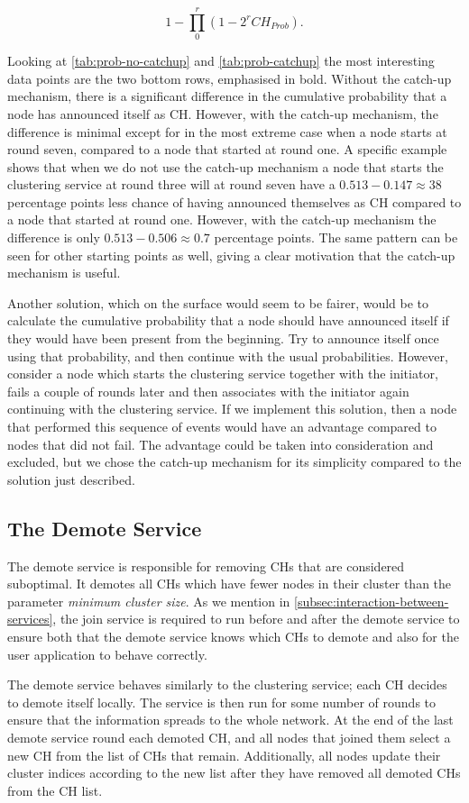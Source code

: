 \begin{equation}
1 - \prod_0^r (1 - 2^rCH_{Prob}).   
\end{equation}

Looking at \cref{tab:prob-no-catchup} and \cref{tab:prob-catchup} the most interesting data points are the two bottom rows, emphasised in bold. Without the catch-up mechanism, there is a significant difference in the cumulative probability that a node has announced itself as CH. However, with the catch-up mechanism, the difference is minimal except for in the most extreme case when a node starts at round seven, compared to a node that started at round one. A specific example shows that when we do not use the catch-up mechanism a node that starts the clustering service at round three will at round seven have a $0.513 - 0.147 \approx 38$ percentage points less chance of having announced themselves as CH compared to a node that started at round one. However, with the catch-up mechanism the difference is only $0.513 - 0.506 \approx 0.7$ percentage points. The same pattern can be seen for other starting points as well, giving a clear motivation that the catch-up mechanism is useful. 

Another solution, which on the surface would seem to be fairer, would be to calculate the cumulative probability that a node should have announced itself if they would have been present from the beginning. Try to announce itself once using that probability, and then continue with the usual probabilities. However, consider a node which starts the clustering service together with the initiator, fails a couple of rounds later and then associates with the initiator again continuing with the clustering service. If we implement this solution, then a node that performed this sequence of events would have an advantage compared to nodes that did not fail. The advantage could be taken into consideration and excluded, but we chose the catch-up mechanism for its simplicity compared to the solution just described.





\subsection{The Demote Service}
The demote service is responsible for removing CHs that are considered suboptimal. It demotes all CHs which have fewer nodes in their cluster than the parameter \emph{minimum cluster size}. As we mention in \cref{subsec:interaction-between-services}, the join service is required to run before and after the demote service to ensure both that the demote service knows which CHs to demote and also for the user application to behave correctly.

The demote service behaves similarly to the clustering service; each CH decides to demote itself locally. The service is then run for some number of rounds to ensure that the information spreads to the whole network. At the end of the last demote service round each demoted CH, and all nodes that joined them select a new CH from the list of CHs that remain. Additionally, all nodes update their cluster indices according to the new list after they have removed all demoted CHs from the CH list.
